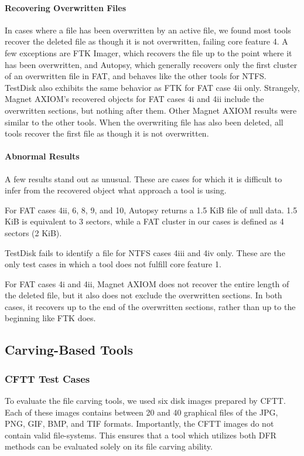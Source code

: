 \documentclass{ws-rv9x6}
\newenvironment{paraphrase}{\color{blue}}{\color{black}} %
\begin{document}
\begin{paraphrase}
\paragraph{Recovering Overwritten Files}
In cases where a file has been overwritten by an active file, we found most tools recover the deleted file as though it is not overwritten, failing core feature 4. 
A few exceptions are FTK Imager, which recovers the file up to the point where it has been overwritten, and Autopsy, which generally recovers only the first cluster of an overwritten file in FAT, and behaves like the other tools for NTFS. 
TestDisk also exhibits the same behavior as FTK for FAT case 4ii only. 
Strangely, Magnet AXIOM's recovered objects for FAT cases 4i and 4ii include the overwritten sections, but nothing after them.
Other Magnet AXIOM results were similar to the other tools.
When the overwriting file has also been deleted, all tools recover the first file as though it is not overwritten.

\paragraph{Abnormal Results}
A few results stand out as unusual.
These are cases for which it is difficult to infer from the recovered object what approach a tool is using.

For FAT cases 4ii, 6, 8, 9, and 10, Autopsy returns a 1.5 KiB file of null data.
1.5 KiB is equivalent to 3 sectors, while a FAT cluster in our cases is defined as 4 sectors (2 KiB).

TestDisk fails to identify a file for NTFS cases 4iii and 4iv only. 
These are the only test cases in which a tool does not fulfill core feature 1.

For FAT cases 4i and 4ii, Magnet AXIOM does not recover the entire length of the deleted file, but it also does not exclude the overwritten sections. 
In both cases, it recovers up to the end of the overwritten sections, rather than up to the beginning like FTK does.
\end{paraphrase}




\subsection{Carving-Based Tools}

\subsubsection{CFTT Test Cases}
To evaluate the file carving tools, we used six disk images prepared by CFTT\cite{cftt_carving_images}.
Each of these images contains between 20 and 40 graphical files of the JPG, PNG, GIF, BMP, and TIF formats.
Importantly, the CFTT images do not contain valid file-systems.
This ensures that a tool which utilizes both DFR methods can be evaluated solely on its file carving ability.
\end{document}

